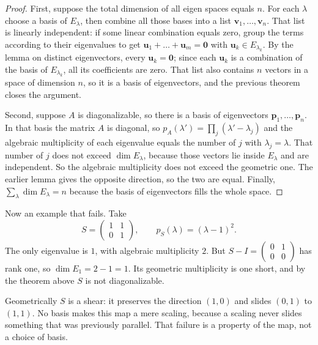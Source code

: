 \begin{proof}
First, suppose the total dimension of all eigen spaces equals $n$. For each $\lambda$ choose a
basis of $E_{\lambda}$, then combine all those bases into a list $\mathbf{v}_{1},\dots,
\mathbf{v}_{n}$. That list is linearly independent: if some linear combination equals zero, group
the terms according to their eigenvalues to get $\mathbf{u}_{1}+\dots+\mathbf{u}_{m}=\mathbf{0}$
with $\mathbf{u}_{k}\in E_{\lambda_{k}}$. By the lemma on distinct eigenvectors, every
$\mathbf{u}_{k}=\mathbf{0}$; since each $\mathbf{u}_{k}$ is a combination of the basis of
$E_{\lambda_{k}}$, all its coefficients are zero. That list also contains $n$ vectors in a space of
dimension $n$, so it is a basis of eigenvectors, and the previous theorem closes the argument.

Second, suppose $A$ is diagonalizable, so there is a basis of eigenvectors
$\mathbf{p}_{1},\dots,\mathbf{p}_{n}$. In that basis the matrix $A$ is diagonal, so
$p_{A}(\lambda')=\prod_{j}(\lambda'-\lambda_{j})$ and the algebraic multiplicity of each
eigenvalue equals the number of $j$ with $\lambda_{j}=\lambda$. That number of $j$ does not exceed
$\dim E_{\lambda}$, because those vectors lie inside $E_{\lambda}$ and are independent. So the
algebraic multiplicity does not exceed the geometric one. The earlier lemma gives the opposite
direction, so the two are equal. Finally, $\sum_{\lambda}\dim E_{\lambda}=n$ because the basis of
eigenvectors fills the whole space.
\end{proof}

Now an example that fails. Take
\[
  S=\begin{pmatrix}1&1\\ 0&1\end{pmatrix},\qquad p_{S}(\lambda)=(\lambda-1)^{2}.
\]
The only eigenvalue is $1$, with algebraic multiplicity $2$. But
$S-I=\begin{pmatrix}0&1\\ 0&0\end{pmatrix}$ has rank one, so $\dim E_{1}=2-1=1$. Its geometric
multiplicity is one short, and by the theorem above $S$ is not diagonalizable.

Geometrically $S$ is a shear: it preserves the direction $(1,0)$ and slides $(0,1)$ to $(1,1)$. No
basis makes this map a mere scaling, because a scaling never slides something that was previously
parallel. That failure is a property of the map, not a choice of basis.

